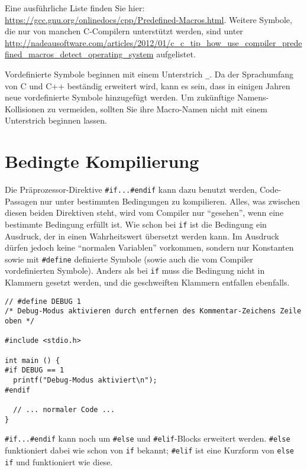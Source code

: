Eine ausführliche Liste finden Sie hier: \url{https://gcc.gnu.org/onlinedocs/cpp/Predefined-Macros.html}. Weitere Symbole, die nur von manchen C-Compilern unterstützt werden, sind unter \url{http://nadeausoftware.com/articles/2012/01/c_c_tip_how_use_compiler_predefined_macros_detect_operating_system} aufgelistet.

\begin{hintbox}
Vordefinierte Symbole beginnen \idR mit einem Unterstrich \texttt{\_}. Da der Sprachumfang von C und C++ beständig erweitert wird, kann es sein, dass in einigen Jahren neue vordefinierte Symbole hinzugefügt werden. Um zukünftige Namens-Kollisionen zu vermeiden, sollten Sie ihre Macro-Namen nicht mit einem Unterstrich beginnen lassen.
\end{hintbox}

\section{Bedingte Kompilierung} \label{sec:PreprocIF}
Die Präprozessor-Direktive \texttt{#if...#endif} kann dazu benutzt werden, Code-Passagen nur unter bestimmten Bedingungen zu kompilieren. Alles, was zwischen diesen beiden Direktiven steht, wird vom Compiler nur \enquote{gesehen}, wenn eine bestimmte Bedingung erfüllt ist. Wie schon bei \texttt{if} ist die Bedingung ein Ausdruck, der in einen Wahrheitswert übersetzt werden kann. Im Ausdruck dürfen jedoch keine \enquote{normalen Variablen} vorkommen, sondern nur Konstanten sowie mit \texttt{#define} definierte Symbole (sowie auch die vom Compiler vordefinierten Symbole). Anders als bei \texttt{if} muss die Bedingung nicht in Klammern gesetzt werden, und die geschweiften Klammern entfallen ebenfalls.

\begin{codebox}
\begin{verbatim}
// #define DEBUG 1   
/* Debug-Modus aktivieren durch entfernen des Kommentar-Zeichens Zeile oben */

#include <stdio.h>

int main () {
#if DEBUG == 1
  printf("Debug-Modus aktiviert\n");
#endif
  
  // ... normaler Code ...
}   
\end{verbatim}
\end{codebox}

\texttt{#if...#endif} kann noch um \texttt{#else} und \texttt{#elif}-Blocks erweitert werden. \texttt{#else} funktioniert dabei wie schon von \texttt{if} bekannt; \texttt{#elif} ist eine Kurzform von \texttt{else if} und funktioniert wie diese.

